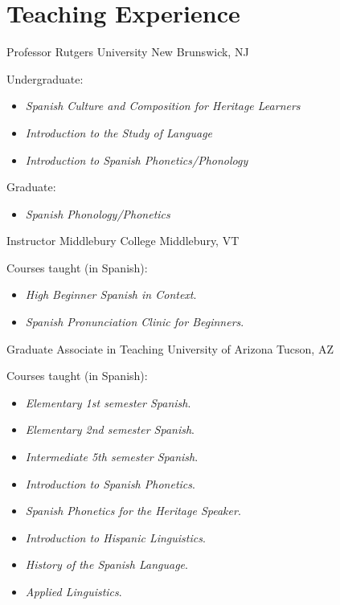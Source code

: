 \documentclass[11pt,letterpaper]{moderncv}
\begin{document}
\section{Teaching Experience}

        {Professor}
        {Rutgers University}
        {New Brunswick, NJ}
        {}
        {
        Undergraduate:
        \begin{itemize}
            \item[] \small \emph{Spanish Culture and Composition for Heritage Learners}
            \item[] \small \emph{Introduction to the Study of Language}
            \item[] \small \emph{Introduction to Spanish Phonetics/Phonology}
        \end{itemize}
        Graduate:
        \begin{itemize}
            \item[] \small \emph{Spanish Phonology/Phonetics}
        \end{itemize}
        }
        {Instructor}
        {Middlebury College}
        {Middlebury, VT}
        {}
        {Courses taught (in Spanish):
        \begin{itemize}
          \item[] \small \emph{High Beginner Spanish in Context}.\vspace{-.03in}
          \item[] \small \emph{Spanish Pronunciation Clinic for Beginners}.
        \end{itemize}}
        {Graduate Associate in Teaching}
        {University of Arizona}
        {Tucson, AZ}
        {}
        {Courses taught (in Spanish):
        \begin{itemize}
          \item[] \small \emph{Elementary 1st semester Spanish}.\vspace{-.03in}
          \item[] \small \emph{Elementary 2nd semester Spanish}.\vspace{-.03in}
          \item[] \small \emph{Intermediate 5th semester Spanish}.\vspace{-.03in}
          \item[] \small \emph{Introduction to Spanish Phonetics}.\vspace{-.03in}
          \item[] \small \emph{Spanish Phonetics for the Heritage Speaker}.\vspace{-.03in}
          \item[] \small \emph{Introduction to Hispanic Linguistics}.\vspace{-.03in}
          \item[] \small \emph{History of the Spanish Language}.\vspace{-.03in}
          \item[] \small \emph{Applied Linguistics}.
        \end{itemize}}
\end{document}
